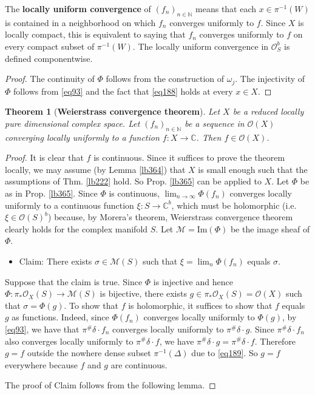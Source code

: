 \documentclass[12pt,b5paper,notitlepage]{report}
\theoremstyle{definition}
\theoremstyle{plain}
\newtheorem{thm}[df]{Theorem}
\newcommand{\scr}{\mathscr}
\newcommand{\Cbb}{\mathbb C}
\newcommand{\Nbb}{\mathbb N}
\newcommand{\Imag}{\mathrm{Im}}
\numberwithin{equation}{section}
\begin{document}
The \textbf{locally uniform convergence}   of $(f_n)_{n\in\Nbb}$ means that each $x\in \pi^{-1}(W)$ is contained in a neighborhood on which $f_n$ converges uniformly to $f$. Since $X$ is locally compact, this is equivalent to saying that $f_n$ converges uniformly to $f$ on every compact subset of $\pi^{-1}(W)$. The locally uniform convergence in $\scr O_S^b$ is defined componentwise.

\begin{proof}
The continuity of $\Phi$ follows from the construction of $\omega_j$. The injectivity of $\Phi$ follows from \eqref{eq93} and the fact that \eqref{eq188} holds at every $x\in X$.
\end{proof}



\begin{thm}[\textbf{Weierstrass convergence theorem}]\label{lb366}
Let $X$ be a reduced locally pure dimensional complex space. Let $(f_n)_{n\in\Nbb}$ be a sequence in $\scr O(X)$ converging locally uniformly to a function $f:X\rightarrow\Cbb$. Then $f\in \scr O(X)$.
\end{thm}



\begin{proof}
It is clear that $f$ is continuous. Since it suffices to prove the theorem locally, we may assume (by Lemma \ref{lb364}) that $X$ is small enough such that the assumptions of Thm. \ref{lb222} hold. So Prop. \ref{lb365} can be applied to $X$. Let $\Phi$ be as in Prop. \ref{lb365}. Since $\Phi$ is continuous, $\lim_{n\rightarrow\infty}\Phi(f_n)$ converges locally uniformly to a continuous function $\xi:S\rightarrow\Cbb^b$, which must be holomorphic (i.e. $\xi\in\scr O(S)^b$) because, by Morera's theorem, Weierstrass convergence theorem clearly holds for the complex manifold $S$. Let $\scr M=\Imag(\Phi)$ be the image sheaf of $\Phi$. %
\begin{itemize}
\item Claim: There exists $\sigma\in \scr M(S)$ such that $\xi=\lim_n \Phi(f_n)$ equals $\sigma$. 
\end{itemize}
Suppose that the claim is true. Since $\Phi$ is injective and hence $\Phi:\pi_*\scr O_X(S)\rightarrow\scr M(S)$ is bijective, there exists $g\in\pi_*\scr O_X(S)=\scr O(X)$ such that $\sigma=\Phi(g)$. To show that $f$ is holomorphic, it suffices to show that $f$ equals $g$ as functions. Indeed, since $\Phi(f_n)$ converges locally uniformly to $\Phi(g)$, by \eqref{eq93}, we have that $\pi^\#\delta\cdot f_n$ converges locally uniformly to $\pi^\#\delta\cdot g$. Since $\pi^\#\delta\cdot f_n$ also converges locally uniformly to $\pi^\#\delta\cdot f$, we have $\pi^\#\delta\cdot g=\pi^\#\delta\cdot f$. Therefore $g=f$ outside the nowhere dense subset $\pi^{-1}(\Delta)$ due to \eqref{eq189}. So $g=f$ everywhere because $f$ and $g$ are continuous.

The proof of Claim follows from the following lemma.
\end{proof}
\end{document}
